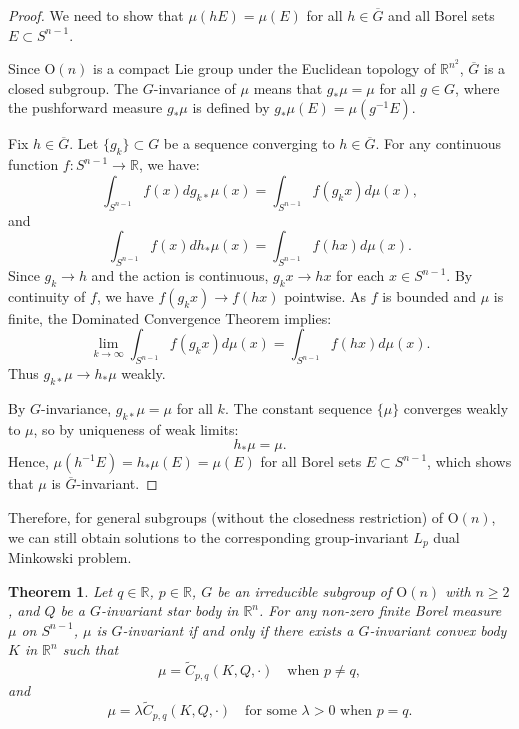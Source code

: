 \documentclass[12pt, reqno]{amsart}
\newtheorem{theorem}{Theorem}[section]
\theoremstyle{definition}
\theoremstyle{remark}
\numberwithin{equation}{section}
\newcommand{\R}{\mathbb{R}}
\newcommand{\Sn}{S^{n-1}}
\newcommand{\On}{\mathrm{O}(n)}
\newcommand{\clG}{\overline{G}}
\begin{document}
			\begin{proof}
				We need to show that $\mu(hE) = \mu(E)$ for all $h \in \clG$ and all Borel sets $E \subset \Sn$.
				
				
				Since $\On$ is a compact Lie group under the Euclidean topology of $\R^{n^2}$, 
				$\clG$ is  a closed subgroup. The $G$-invariance of $\mu$ means that $g_*\mu = \mu$ 
				for all $g \in G$, where the pushforward measure $g_*\mu$ is defined by $g_*\mu(E) = \mu(g^{-1}E)$.
				
			
			Fix $h \in \clG$.		Let $\{g_k\} \subset G$ be a sequence converging to $h \in \clG$. For any  continuous function $f: \Sn \to \R$, we have:
				\[
				\int_{\Sn} f(x)  dg_{k*}\mu(x) = \int_{\Sn} f(g_k x)  d\mu(x), 
				\]
				and
				\[
				\int_{\Sn} f(x)  dh_*\mu(x) = \int_{\Sn} f(h x)  d\mu(x).
				\]
				Since $g_k \to h$ and the action is continuous, $g_k x \to h x$ for each $x \in \Sn$. By continuity of $f$, we have $f(g_k x) \to f(h x)$ pointwise. As $f$ is bounded  and $\mu$ is finite, the Dominated Convergence Theorem implies:
				\[
				\lim_{k \to \infty} \int_{\Sn} f(g_k x)  d\mu(x) = \int_{\Sn} f(h x)  d\mu(x).
				\]
				Thus $g_{k*}\mu \to h_*\mu$ weakly.
				
				
				 By $G$-invariance, $g_{k*}\mu = \mu$ for all $k$. The constant sequence $\{\mu\}$ converges weakly to $\mu$, so by uniqueness of weak limits:
				\[
				h_*\mu = \mu.
				\]
				Hence, $\mu(h^{-1}E) = h_*\mu(E) = \mu(E)$ for all Borel sets $E \subset \Sn$, which shows that $\mu$ is $\clG$-invariant.
			\end{proof}
			
			Therefore, for general subgroups (without the closedness restriction) of $\On$, we can still obtain solutions to the corresponding group-invariant $L_{p}$ dual Minkowski problem.
			
			\begin{theorem}\label{general exist}
				Let $q\in\mathbb{R}$, $p \in \mathbb{R}$, $G$ be an irreducible subgroup of $\mathrm{O}(n)$ with $n \geq 2$, and $Q$ be a $G$-invariant star body in $\mathbb{R}^n$. For any non-zero finite Borel measure $\mu$ on $S^{n-1}$, $\mu$ is $G$-invariant if and only if there exists a $G$-invariant convex body $K$ in $\mathbb{R}^n$ such that
			\[
			\mu = \widetilde{C}_{p,q}(K, Q, \cdot) \quad \text{when  $p \neq q$},
			\]
			and
			\[
			\mu = \lambda \widetilde{C}_{p,q}(K, Q, \cdot) \quad \text{for some $\lambda>0$ when $p=q$}.
			\]
			\end{theorem}
			
\end{document}
